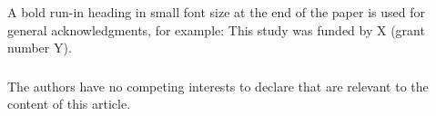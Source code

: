 \documentclass[runningheads]{llncs}
\begin{document}


\begin{credits}
	\subsubsection{\ackname} A bold run-in heading in small font size at the end of the paper is
	used for general acknowledgments, for example: This study was funded
	by X (grant number Y).
	
	\subsubsection{\discintname}
	The authors have no competing interests to declare that are
	relevant to the content of this article.
\end{credits}



%
%

{}
\end{document}

